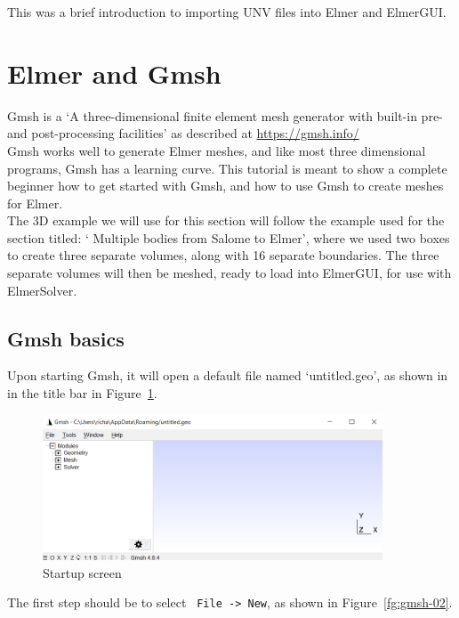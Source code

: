 This was a brief introduction to importing UNV files into Elmer and ElmerGUI.


\newpage

\section{Elmer and Gmsh}

Gmsh is a `A three-dimensional finite element mesh generator with built-in pre- and post-processing facilities' as described at \url{https://gmsh.info/}\\

Gmsh works well to generate Elmer meshes, and like most three dimensional programs, Gmsh has a  learning curve.  This tutorial is meant to show a complete beginner how to get started with Gmsh, and how to use Gmsh to create meshes for Elmer.\\

The 3D example we will use for this section will follow the example used for the section titled: ` Multiple bodies from Salome to Elmer', where we used two boxes to create three separate volumes, along with 16 separate boundaries.  The three separate volumes will then be meshed, ready to load into ElmerGUI, for use with ElmerSolver.

\subsection{Gmsh basics}

Upon starting Gmsh, it will open a default file named `untitled.geo', as shown in in the title bar in  Figure~\ref{fg:gmsh-01}.

\begin{figure}[H]
\centering
\includegraphics[width=0.9\textwidth]{gmsh-01}
\caption{Startup screen}\label{fg:gmsh-01}
\end{figure}

The first step should be to select \texttt{ File -> New}, as shown in Figure~\ref{fg:gmsh-02}.

